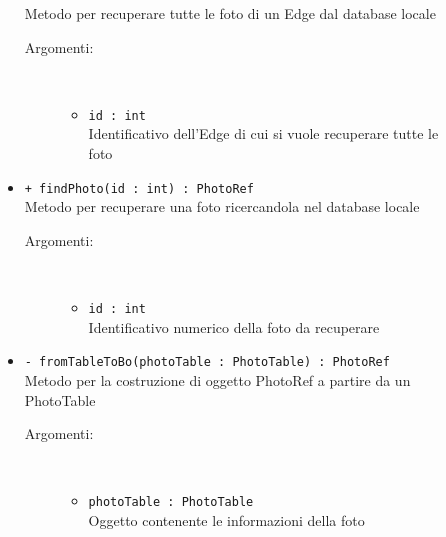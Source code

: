 \documentclass[../DefinizioneDiProdotto.tex]{subfiles}
\begin{document}
\begin{description}
\begin{itemize}
		Metodo per recuperare tutte le foto di un Edge dal database locale
		\begin{description}
			\item[Argomenti:] \
			\begin{itemize}
				\item \texttt{id : int}\\
				Identificativo dell'Edge di cui si vuole recuperare tutte le foto\end{itemize}
		\end{description}
		\item \texttt{+ findPhoto(id : int) : PhotoRef}\\
		Metodo per recuperare una foto ricercandola nel database locale
		\begin{description}
			\item[Argomenti:] \
			\begin{itemize}
				\item \texttt{id : int}\\
				Identificativo numerico della foto da recuperare\end{itemize}
		\end{description}
		\item \texttt{- fromTableToBo(photoTable : PhotoTable) : PhotoRef}\\
		Metodo per la costruzione di oggetto PhotoRef a partire da un PhotoTable
		\begin{description}
			\item[Argomenti:] \
			\begin{itemize}
				\item \texttt{photoTable : PhotoTable}\\
				Oggetto contenente le informazioni della foto\end{itemize}
		\end{description}
	\end{itemize}
\end{description}
\end{document}
